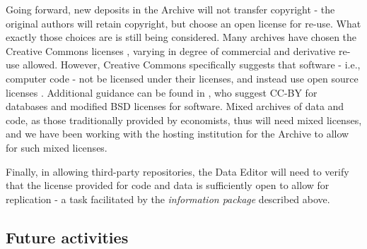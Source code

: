 \documentclass[AEJ]{AEA}
\begin{document}
Going forward, new deposits in the Archive will not transfer copyright - the original authors will retain copyright, but choose an open license for re-use. What exactly those choices are is still being considered. Many archives have chosen the Creative Commons licenses \cite{CreativeCommons2017}, varying in degree of commercial and derivative re-use allowed. However, Creative Commons specifically suggests that software - i.e., computer code - not be licensed under their licenses, and instead use open source licenses \cite{OpenSourceInitiative2018}. Additional guidance can be found in \cite{StoddenSoftwarePatentsBarrier2012}, who suggest CC-BY for databases and modified BSD licenses for software.  Mixed archives of data and code, as those traditionally provided by economists, thus will need mixed licenses, and we have been working with the hosting institution for the Archive to allow for such mixed licenses. 

Finally, in allowing third-party repositories, the Data Editor will need to verify that the license provided for code and data is sufficiently open to allow for replication - a task facilitated by the \textit{information package} described above. 


\subsection{Future activities}
\end{document}
